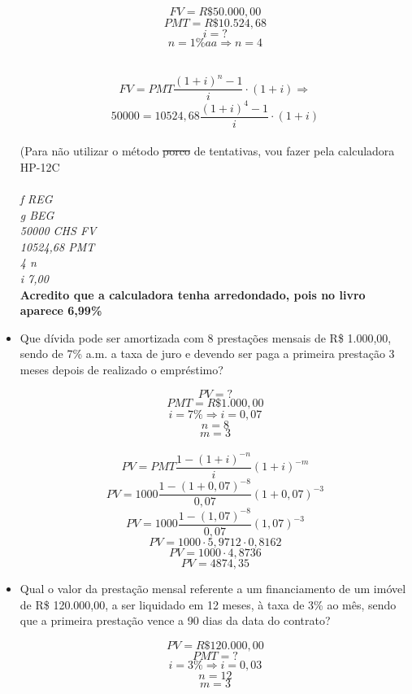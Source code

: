 \documentclass[a4paper, 12pt]{article}
\begin{document}
\begin{itemize}
$$ FV = R\$50.000,00 $$
$$ PMT = R\$10.524,68 $$  
$$ i = ? $$
$$ n = 1\%aa \Rightarrow n = 4 $$

\\
$$ FV = PMT\frac{(1+i)^{n}-1}{i}\cdot(1+i) \Rightarrow $$
$$ 50000 = 10524,68\frac{(1+i)^{4}-1}{i}\cdot(1+i) $$
\\
(Para não utilizar o método \sout{porco} de tentativas, vou fazer pela calculadora HP-12C\\\\
\emph{f REG}\\
\emph{g BEG}\\
\emph{50000 CHS FV}\\
\emph{10524,68 PMT}\\
\emph{4 n} \\
\emph{i 7,00} \\
\textbf{Acredito que a calculadora tenha arredondado, pois no livro aparece 6,99\%}

\item Que dívida pode ser amortizada com 8 prestações mensais de R\$ 1.000,00, sendo de 7\% a.m. a taxa de juro e devendo ser paga a primeira prestação 3 meses depois de realizado o empréstimo?

$$ PV = ? $$
$$ PMT = R\$1.000,00 $$  
$$ i = 7\% \Rightarrow i = 0,07 $$
$$ n = 8 $$
$$ m = 3 $$  \\
  
$$ PV = PMT\frac{1-(1+i)^{-n}}{i}(1+i)^{-m} $$
$$ PV = 1000\frac{1-(1+0,07)^{-8}}{0,07}(1+0,07)^{-3} $$
$$ PV = 1000\frac{1-(1,07)^{-8}}{0,07}(1,07)^{-3} $$
$$ PV = 1000 \cdot 5,9712 \cdot 0,8162 $$
$$ PV = 1000 \cdot 4,8736 $$
$$ \boxed{PV = 4874,35} $$  


\item Qual o valor da prestação mensal referente a um financiamento de um imóvel de R\$ 120.000,00, a ser liquidado em 12 meses, à taxa de 3\% ao mês, sendo que a primeira prestação vence a 90 dias da data do contrato?

$$ PV = R\$120.000,00 $$
$$ PMT = ? $$  
$$ i = 3\% \Rightarrow i = 0,03 $$
$$ n = 12 $$
$$ m = 3 $$  


\end{itemize}
\end{document}
